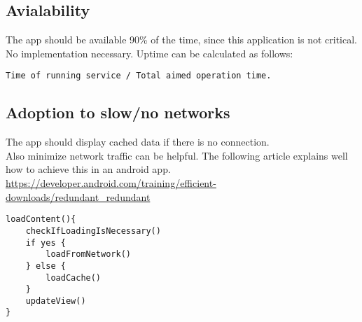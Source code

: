 \documentclass[conference]{IEEEtran}
\numberwithin{figure}{subsection}
\begin{document}
\subsection{Avialability}
The  app  should  be  available  90\%  of  the time, since this application is not critical.\\

No implementation necessary. Uptime can be calculated as follows:

\begin{lstlisting}
Time of running service / Total aimed operation time.
\end{lstlisting}


\subsection{Adoption to slow/no networks}
The app should display cached data if there is no connection.\\

Also minimize network traffic can be helpful. The following article explains well how to achieve this in an android app.
\url{https://developer.android.com/training/efficient-downloads/redundant_redundant}

\begin{lstlisting}
loadContent(){
    checkIfLoadingIsNecessary()
    if yes {
        loadFromNetwork()
    } else {
        loadCache()
    }
    updateView()
}
\end{lstlisting}



			
\end{document}
